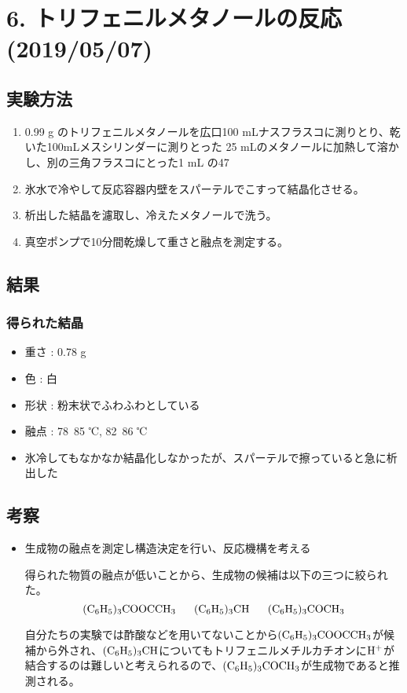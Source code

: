 \documentclass[a4paper,papersize,dvipdfmx]{jsarticle}
\begin{document}
\section*{6. トリフェニルメタノールの反応  (2019/05/07)}
\subsection*{実験方法}
\begin{enumerate}
\item 0.99 g のトリフェニルメタノールを広口100 mLナスフラスコに測りとり、乾いた100mLメスシリンダーに測りとった 25 mLのメタノールに加熱して溶かし、別の三角フラスコにとった1 mL の47 %
\item 氷水で冷やして反応容器内壁をスパーテルでこすって結晶化させる。
\item 析出した結晶を濾取し、冷えたメタノールで洗う。
\item 真空ポンプで10分間乾燥して重さと融点を測定する。
\end{enumerate}
\subsection*{結果}
\subsubsection*{得られた結晶}
\begin{itemize}
\item 重さ : 0.78 g
\item 色 : 白
\item 形状 : 粉末状でふわふわとしている
\item 融点 : 78~85 ℃, 82~86 ℃
\item 氷冷してもなかなか結晶化しなかったが、スパーテルで擦っていると急に析出した



\end{itemize}
\subsection*{考察}
\begin{itemize}
\item 生成物の融点を測定し構造決定を行い、反応機構を考える

得られた物質の融点が低いことから、生成物の候補は以下の三つに絞られた。
\[\rm (C_6H_5)_3COOCCH_3  \ \ \ \ \   (C_6H_5)_3CH \ \ \ \ \ (C_6H_5)_3COCH_3\]

自分たちの実験では酢酸などを用いてないことから$\rm (C_6H_5)_3COOCCH_3$が候補から外され、$\rm (C_6H_5)_3CH$についてもトリフェニルメチルカチオンに$\rm H^+$が結合するのは難しいと考えられるので、$\rm (C_6H_5)_3COCH_3$が生成物であると推測される。
\end{itemize}
\end{document}
